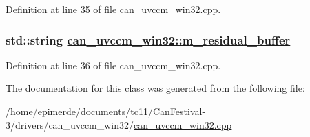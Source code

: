 Definition at line 35 of file can\_\-uvccm\_\-win32.cpp.\hypertarget{classcan__uvccm__win32_d264855657adc02fbc687f37d302fc9f}{
\subsubsection[m\_\-residual\_\-buffer]{\setlength{\rightskip}{0pt plus 5cm}std::string \hyperlink{classcan__uvccm__win32_d264855657adc02fbc687f37d302fc9f}{can\_\-uvccm\_\-win32::m\_\-residual\_\-buffer}}}
\label{classcan__uvccm__win32_d264855657adc02fbc687f37d302fc9f}




Definition at line 36 of file can\_\-uvccm\_\-win32.cpp.

The documentation for this class was generated from the following file:\begin{CompactItemize}
\item 
/home/epimerde/documents/tc11/Can\-Festival-3/drivers/can\_\-uvccm\_\-win32/\hyperlink{can__uvccm__win32_8cpp}{can\_\-uvccm\_\-win32.cpp}\end{CompactItemize}
